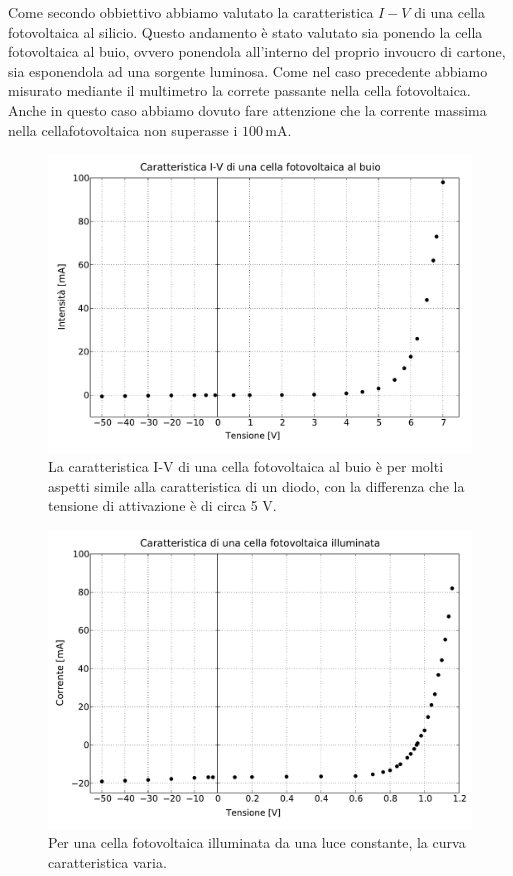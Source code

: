 Come secondo obbiettivo abbiamo valutato la caratteristica $I-V$ di una cella fotovoltaica al silicio. Questo andamento è stato valutato sia ponendo la cella fotovoltaica al buio, ovvero ponendola all'interno del proprio invoucro di cartone, sia esponendola ad una sorgente luminosa.
Come nel caso precedente abbiamo misurato mediante il multimetro la correte passante nella cella fotovoltaica.
Anche in questo caso abbiamo dovuto fare attenzione che la corrente massima nella cellafotovoltaica non superasse i $100\,\si{\milli\ampere}$.

\begin{figure}
    \includegraphics[scale=0.5]{buio.pdf}
    \caption{La caratteristica I-V di una cella fotovoltaica al buio è per molti aspetti simile alla caratteristica di un diodo,
        con la differenza che la tensione di attivazione è di circa 5 V.}
    \label{fig:buio}
\end{figure}

\begin{figure}
    \includegraphics[scale=0.5]{luce.pdf}
    \caption{Per una cella fotovoltaica illuminata da una luce constante, la curva caratteristica varia. }
    \label{fig:luce}
\end{figure}

